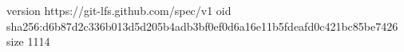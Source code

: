 version https://git-lfs.github.com/spec/v1
oid sha256:d6b87d2c336b013d5d205b4adb3bf0ef0d6a16e11b5fdeafd0c421bc85be7426
size 1114
